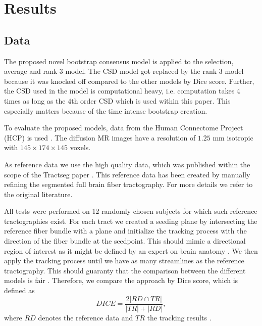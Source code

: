 \section{Results}
\subsection{Data}
The proposed novel bootstrap consensus model is applied to the selection,
average and rank $3$ model. The CSD model got replaced by the rank $3$ model
because it was knocked off compared to the other models by Dice score. Further,
the CSD used in the model is computational heavy, i.e. computation takes 4 times as long
as the $4$th order CSD which is used within this paper. This especially matters
because of the time intense bootstrap creation. 

To evaluate the proposed models, data from the Human
Connectome Project (HCP) is used \cite{HCP}. The diffusion MR images have a resolution of $1.25$ mm
isotropic with $145 \times 174 \times 145$ voxels. 

As reference data we use the high quality data, which was published within the
scope of the Tractseg paper \cite{WASSERTHAL2018239}. This reference data has been
created by manually refining the segmented full brain fiber tractography. For
more details we refer to the original literature.

All tests were performed on 12 randomly chosen subjects for which such reference tractographies
exist. For each tract we created a seeding plane by intersecting the reference
fiber bundle with a plane and initialize the tracking process with the direction
of the fiber bundle at the seedpoint. This should mimic a directional region of
interest as it might be defined by an expert on brain anatomy
\cite{Graumann2016}. We then apply the tracking process until we have as many
streamlines as the reference tractography. This should guaranty that the
comparison between the different models is fair . Therefore, we compare the approach by
Dice score, which is defined as
\[ 
	DICE = \frac{2 |RD \cap TR |}{|TR| + |RD|} ,
\]
where $RD$ denotes the reference data and $TR$ the tracking results
\cite{SCHILLING2019194}. 

